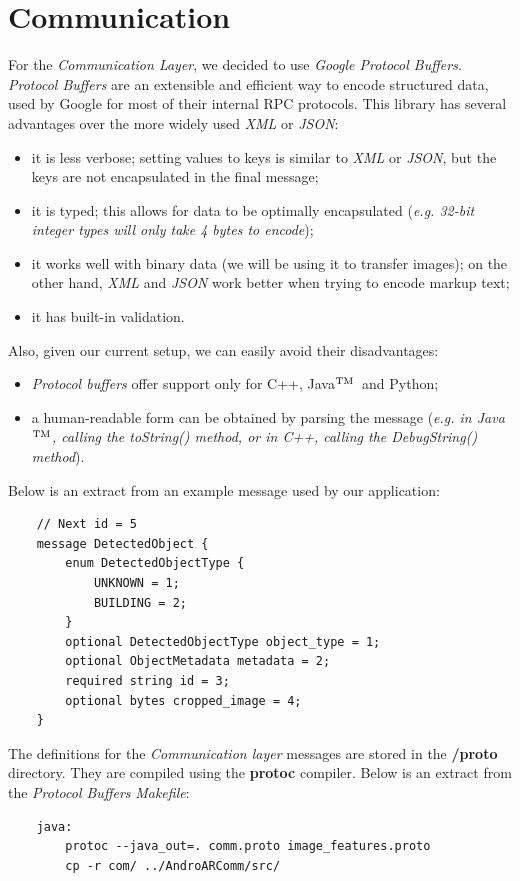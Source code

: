 \documentclass[a4paper,onecolumn,oneside,titlepage,11pt]{report}
\def\tm{\leavevmode\hbox{$\rm {}^{TM}$}}
\begin{document}
\section{Communication}
For the \emph{Communication Layer}, we decided to use \emph{Google Protocol Buffers}. \emph{Protocol Buffers} are an extensible and efficient way to encode structured data, used by Google for most of their internal RPC protocols. This library has several advantages over the more widely used \emph{XML} or \emph{JSON}:
\begin{itemize}
	\item it is less verbose; setting values to keys is similar to \emph{XML} or \emph{JSON}, but the keys are not encapsulated in the final message;
	\item it is typed; this allows for data to be optimally encapsulated (\emph{e.g. 32-bit integer types will only take 4 bytes to encode});
	\item it works well with binary data (we will be using it to transfer images); on the other hand, \emph{XML} and \emph{JSON} work better when trying to encode markup text;
	\item it has built-in validation.
\end{itemize}
Also, given our current setup, we can easily avoid their disadvantages:
\begin{itemize}
	\item \emph{Protocol buffers} offer support only for C++, Java\tm\ and Python;
	\item a human-readable form can be obtained by parsing the message (\emph{e.g. in Java\tm, calling the \emph{toString()} method, or in C++, calling the \emph{DebugString()} method}).
\end{itemize}
Below is an extract from an example message used by our application:
\begin{lstlisting}
	// Next id = 5
	message DetectedObject {
		enum DetectedObjectType {
			UNKNOWN = 1;
			BUILDING = 2;
		}
		optional DetectedObjectType object_type = 1;
		optional ObjectMetadata metadata = 2;
		required string id = 3;
		optional bytes cropped_image = 4;
	}
\end{lstlisting}
The definitions for the \emph{Communication layer} messages are stored in the \textbf{/proto} directory. They are compiled using the \textbf{protoc} compiler. Below is an extract from the \emph{Protocol Buffers} \emph{Makefile}:
\begin{lstlisting}
	java:
		protoc --java_out=. comm.proto image_features.proto
		cp -r com/ ../AndroARComm/src/
\end{lstlisting}
\end{document}
